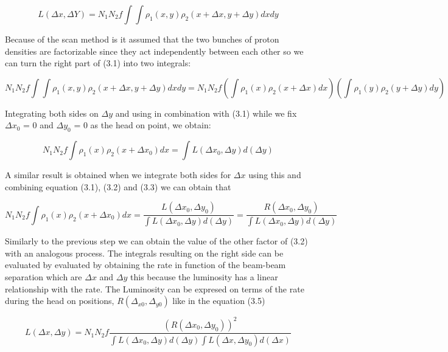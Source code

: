 \begin{equation}
 L(\Delta x, \Delta Y) = N_{1} N_{2} f  \int \int \rho_{1}(x,y)\rho_{2}(x+\Delta x, y+\Delta y) dxdy 
\end{equation}

Because of the scan method is it assumed that the two bunches of proton densities are factorizable since they act independently between each other so we can turn the right part of (3.1) into two integrals:

 \begin{equation}
N_{1} N_{2} f  \int \int \rho_{1}(x,y)\rho_{2}(x+\Delta x, y+\Delta y) dxdy   = N_{1} N_{2} f (\int \rho_{1}(x)\rho_{2}(x + \Delta x) dx) (\int \rho_{1}(y) \rho_{2}(y + \Delta y) dy)
\end{equation}

Integrating both sides on $\Delta y$ and using in combination with (3.1) while we fix $\Delta x_{0}$ = 0 and $\Delta y_{0}$ = 0 as the head on point,  we obtain:
 
 \begin{equation}
N_{1} N_{2} f \int \rho_{1}(x) \rho_{2}(x + \Delta x_{0}) dx = \int L (\Delta x_{0}, \Delta y) d(\Delta y)
\end{equation}

A similar result is obtained when we integrate both sides for $\Delta x$ using this and combining equation (3.1), (3.2) and (3.3) we can obtain that 

\begin{equation}
N_{1} N_{2} f \int \rho_{1}(x) \rho_{2}(x + \Delta x_{0}) dx = \frac{L (\Delta x_{0}, \Delta y_{0})}{\int L(\Delta x_{0}, \Delta y) d(\Delta y)} = \frac{R (\Delta x_{0}, \Delta y_{0})}{\int L(\Delta x_{0}, \Delta y) d(\Delta y)}
\end{equation}

Similarly to the previous step we can obtain the value of the other factor of (3.2) with an analogous process. The integrals resulting on the right side can be evaluated by evaluated by obtaining the rate in function of the beam-beam separation which are $\Delta x$ and $\Delta y$  this because the luminosity has a linear relationship with the rate. The Luminosity can be expresed on terms of the rate during the head on positions, $R(\Delta_{x0}, \Delta_{y0})$ like in the equation (3.5)

\begin{equation}
L(\Delta x, \Delta y) = N_{1} N_{2} f \frac{(R(\Delta x_{0}, \Delta y_{0}))^{2}}{\int L(\Delta x_{0}, \Delta y) d(\Delta y) \int L(\Delta x, \Delta y_{0}) d(\Delta x)}
\end{equation}

